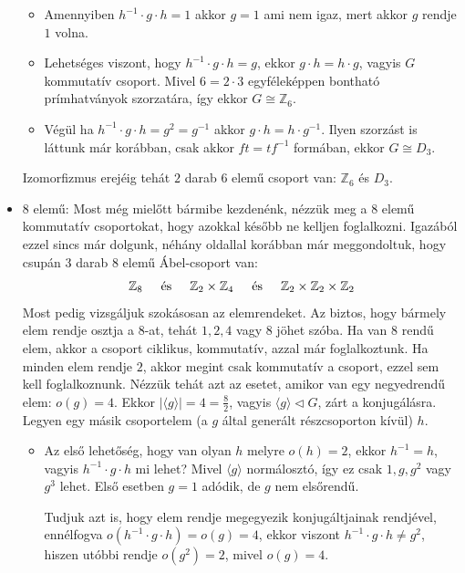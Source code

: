 \documentclass[12pt]{book}
\theoremstyle{plain} %
\theoremstyle{definition} %
\theoremstyle{remark}
\numberwithin{equation}{section}  %
\def\Z{\mathbb{Z}}
\begin{document}
\begin{itemize}
{			\begin{itemize}
				\item Amennyiben $h^{-1} \cdot g \cdot h = 1$ akkor $g=1$ ami nem igaz, mert akkor $g$ rendje $1$ volna.
				\item Lehetséges viszont, hogy $h^{-1} \cdot g \cdot h = g$, ekkor $g\cdot h = h \cdot g$, vagyis $G$ kommutatív csoport. Mivel $6=2\cdot 3$ egyféleképpen bontható prímhatványok szorzatára, így ekkor $G\cong \Z_6$.
				\item Végül ha $h^{-1} \cdot g \cdot h = g^2 = g^{-1}$ akkor $g\cdot h = h\cdot g^{-1}$. Ilyen szorzást is láttunk már korábban, csak akkor $ft=tf^{-1}$ formában, ekkor $G\cong D_3$.
			\end{itemize}
			Izomorfizmus erejéig tehát $2$ darab $6$ elemű csoport van: $\Z_6$ és $D_3$.
		}
		\item{8 elemű:
			Most még mielőtt bármibe kezdenénk, nézzük meg a $8$ elemű kommutatív csoportokat, hogy azokkal később ne kelljen foglalkozni. Igazából ezzel sincs már dolgunk, néhány oldallal korábban már meggondoltuk, hogy csupán $3$ darab $8$ elemű Ábel-csoport van:
			\[ \Z_8 \hspace{5mm} \text{és} \hspace{5mm} \Z_2\times \Z_4 \hspace{5mm} \text{és} \hspace{5mm} \Z_2\times \Z_2 \times \Z_2   \]
			Most pedig vizsgáljuk szokásosan az elemrendeket. Az biztos, hogy bármely elem rendje osztja a $8$-at, tehát $1, 2, 4$ vagy $8$ jöhet szóba. Ha van $8$ rendű elem, akkor a csoport ciklikus, kommutatív, azzal már foglalkoztunk. Ha minden elem rendje $2$, akkor megint csak kommutatív a csoport, ezzel sem kell foglalkoznunk. Nézzük tehát azt az esetet, amikor van egy negyedrendű elem: $o(g) = 4$. Ekkor $|\langle g \rangle| = 4 = \frac{8}{2}$, vagyis $\langle g \rangle \triangleleft G$, zárt a konjugálásra.
			Legyen egy másik csoportelem (a $g$ által generált részcsoporton kívül) $h$.
			\begin{itemize}
				\item Az első lehetőség, hogy van olyan $h$ melyre $o(h) = 2$, ekkor $h^{-1} = h$, vagyis $h^{-1} \cdot g \cdot h$ mi lehet? Mivel $\langle g\rangle $ normálosztó, így ez csak $1, g, g^2$ vagy $g^3$ lehet. Első esetben $g=1$ adódik, de $g$ nem elsőrendű.
				
				Tudjuk azt is, hogy elem rendje megegyezik konjugáltjainak rendjével, ennélfogva $o(h^{-1}\cdot g \cdot h) = o(g) = 4$, ekkor viszont $h^{-1}\cdot g\cdot h \neq g^2$, hiszen utóbbi rendje $o(g^2) = 2$, mivel $o(g) = 4$.
				

\end{itemize}}
\end{itemize}
\end{document}
